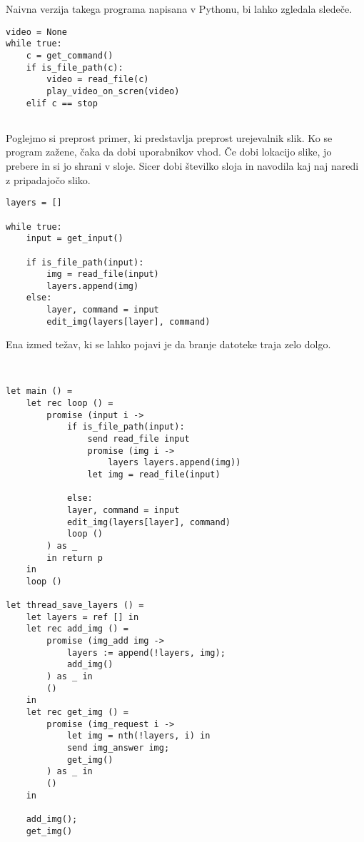 Naivna verzija takega programa napisana v Pythonu, bi lahko zgledala sledeče.

\begin{lstlisting}[caption={Naiven program.},label={prog:predvajalnik-naiven}]
video = None
while true:
	c = get_command()
	if is_file_path(c):
		video = read_file(c)
		play_video_on_scren(video)
	elif c == stop
		
\end{lstlisting}


Poglejmo si preprost primer, ki predstavlja preprost urejevalnik slik.
Ko se program zažene, čaka da dobi uporabnikov vhod.
Če dobi lokacijo slike, jo prebere in si jo shrani v sloje.
Sicer dobi številko sloja in navodila kaj naj naredi z pripadajočo sliko.

\begin{lstlisting}[caption={Sinhron program.},label={prog:editor-python}]
layers = []

while true:
	input = get_input()
	
	if is_file_path(input):
		img = read_file(input)
		layers.append(img)
	else:
		layer, command = input	
		edit_img(layers[layer], command)
\end{lstlisting}

Ena izmed težav, ki se lahko pojavi je da branje datoteke traja zelo dolgo.



\begin{lstlisting}[caption={Asinhron program.},label={prog:editor-aeff}]


let main () = 
	let rec loop () = 
		promise (input i ->
			if is_file_path(input):
				send read_file input
				promise (img i ->
					layers layers.append(img))
				let img = read_file(input)
				
			else:
			layer, command = input	
			edit_img(layers[layer], command)
			loop ()
		) as _ 
		in return p
	in
	loop ()
	
let thread_save_layers () = 
	let layers = ref [] in
	let rec add_img () =
		promise (img_add img ->
			layers := append(!layers, img);
			add_img()
		) as _ in
		()
	in	
	let rec get_img () =
		promise (img_request i ->
			let img = nth(!layers, i) in
			send img_answer img;
			get_img()
		) as _ in
		()
	in
	
	add_img();
	get_img()

\end{lstlisting}